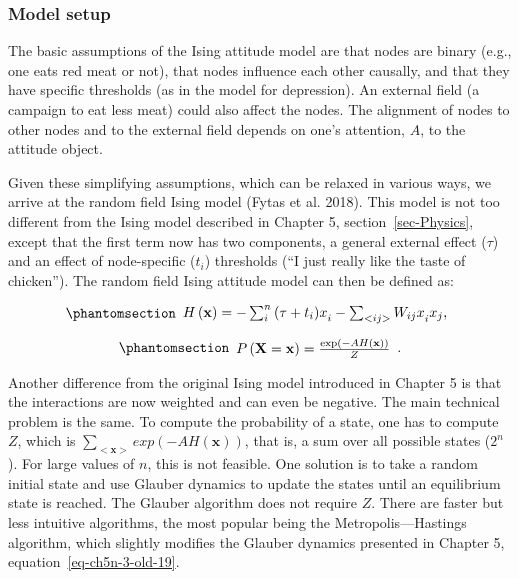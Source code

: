 \documentclass[
  a4paper,
  DIV=11,
  numbers=noendperiod,
  oneside]{scrreprt}
\begin{document}
\subsubsection{Model setup}\label{sec-Model-setup}

The basic assumptions of the Ising attitude model are that nodes are
binary (e.g., one eats red meat or not), that nodes influence each other
causally, and that they have specific thresholds (as in the model for
depression). An external field (a campaign to eat less meat) could also
affect the nodes. The alignment of nodes to other nodes and to the
external field depends on one's attention, \(A\), to the attitude
object.

Given these simplifying assumptions, which can be relaxed in various
ways, we arrive at the random field Ising model (Fytas et al. 2018).
This model is not too different from the Ising model described in
Chapter 5, section~\ref{sec-Physics}, except that the first term now has
two components, a general external effect (\(\tau\)) and an effect of
node-specific (\(t_{i}\)) thresholds (``I just really like the taste of
chicken''). The random field Ising attitude model can then be defined
as:

\begin{equation}\phantomsection\label{eq-ch6-4-old-45}{\begin{array}{r}
H\left( \mathbf{x} \right) = - \sum_{i}^{n}{(\tau + {t_{i})x}_{i}} - \sum_{<ij>}^{}{{W_{ij}x}_{i}x_{j}},
\end{array}}\end{equation}

\begin{equation}\phantomsection\label{eq-ch6-5-old-46}{\begin{array}{r}
P\left( \mathbf{X} = \mathbf{x} \right) = \frac{\exp\left( - AH\left( \mathbf{x} \right) \right)}{Z}
\end{array}.}\end{equation}

Another difference from the original Ising model introduced in Chapter 5
is that the interactions are now weighted and can even be negative. The
main technical problem is the same. To compute the probability of a
state, one has to compute \(Z\), which is
\(\sum_{< \mathbf{x} >}^{}{exp(- AH\left( \mathbf{x} \right))}\), that
is, a sum over all possible states (\(2^{n}\)). For large values of
\(n\), this is not feasible. One solution is to take a random initial
state and use Glauber dynamics to update the states until an equilibrium
state is reached. The Glauber algorithm does not require \(Z\). There
are faster but less intuitive algorithms, the most popular being the
Metropolis---Hastings algorithm, which slightly modifies the Glauber
dynamics presented in Chapter 5, equation~\ref{eq-ch5n-3-old-19}.
\end{document}

